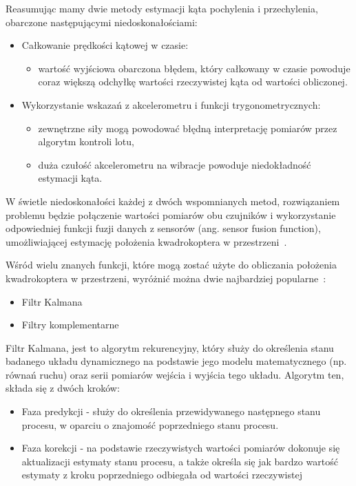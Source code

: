 Reasumując mamy dwie metody estymacji kąta pochylenia i przechylenia, obarczone następującymi niedoskonałościami:

\begin{itemize}
	\item Całkowanie prędkości kątowej w czasie:
		\begin{itemize}
			\item wartość wyjściowa obarczona błędem, który całkowany w czasie powoduje coraz większą odchyłkę wartości rzeczywistej kąta od wartości obliczonej.
		\end{itemize}
	\item Wykorzystanie wskazań z akcelerometru i funkcji trygonometrycznych:
		\begin{itemize}
			\item zewnętrzne siły mogą powodować błędną interpretację pomiarów przez algorytm kontroli lotu,
			\item duża czułość akcelerometru na wibracje powoduje niedokładność estymacji kąta.
		\end{itemize}
\end{itemize}

W świetle niedoskonałości każdej z dwóch wspomnianych metod, rozwiązaniem problemu będzie połączenie wartości pomiarów obu czujników i wykorzystanie odpowiedniej funkcji fuzji danych z sensorów (ang. sensor fusion function), umożliwiającej estymację położenia kwadrokoptera w przestrzeni~\cite{filters1}.

Wśród wielu znanych funkcji, które mogą zostać użyte do obliczania położenia kwadrokoptera w przestrzeni, wyróżnić można dwie najbardziej popularne~\cite{filters1, filters2, filters3}:
\begin{itemize}
	\item Filtr Kalmana
	\item Filtry komplementarne
\end{itemize}

Filtr Kalmana, jest to algorytm rekurencyjny, który służy do określenia stanu badanego układu dynamicznego na podstawie jego modelu matematycznego (np. równań ruchu) oraz serii pomiarów wejścia i wyjścia tego układu. Algorytm ten, składa się z dwóch kroków:

\begin{itemize}
	\item Faza predykcji - służy do określenia przewidywanego następnego stanu procesu, w oparciu o znajomość poprzedniego stanu procesu.
	\item Faza korekcji - na podstawie rzeczywistych wartości pomiarów dokonuje się aktualizacji estymaty stanu procesu, a także określa się jak bardzo wartość estymaty z kroku poprzedniego odbiegała od wartości rzeczywistej
\end{itemize} 


